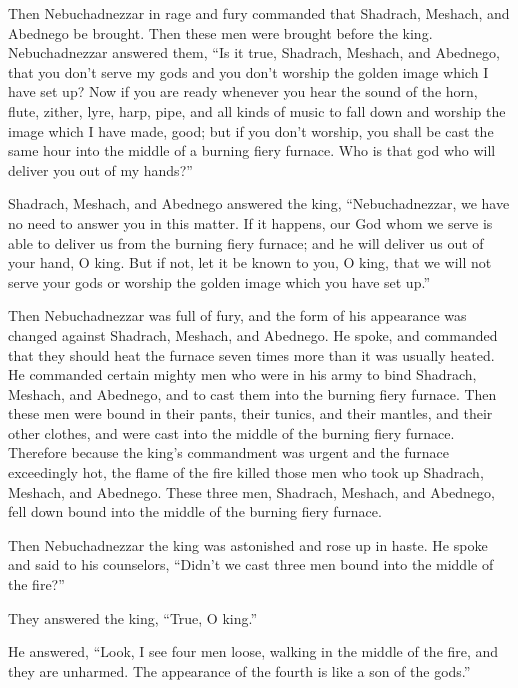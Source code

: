  Then Nebuchadnezzar in rage and fury commanded that
Shadrach, Meshach, and Abednego be brought. Then these men were brought
before the king.  Nebuchadnezzar answered them, ``Is it
true, Shadrach, Meshach, and Abednego, that you don't serve my gods and
you don't worship the golden image which I have set up? 
Now if you are ready whenever you hear the sound of the horn, flute,
zither, lyre, harp, pipe, and all kinds of music to fall down and
worship the image which I have made, good; but if you don't worship, you
shall be cast the same hour into the middle of a burning fiery furnace.
Who is that god who will deliver you out of my hands?''

 Shadrach, Meshach, and Abednego answered the king,
``Nebuchadnezzar, we have no need to answer you in this matter.
 If it happens, our God whom we serve is able to deliver us
from the burning fiery furnace; and he will deliver us out of your hand,
O king.  But if not, let it be known to you, O king, that
we will not serve your gods or worship the golden image which you have
set up.''

 Then Nebuchadnezzar was full of fury, and the form of his
appearance was changed against Shadrach, Meshach, and Abednego. He
spoke, and commanded that they should heat the furnace seven times more
than it was usually heated.  He commanded certain mighty
men who were in his army to bind Shadrach, Meshach, and Abednego, and to
cast them into the burning fiery furnace.  Then these men
were bound in their pants, their tunics, and their mantles, and their
other clothes, and were cast into the middle of the burning fiery
furnace.  Therefore because the king's commandment was
urgent and the furnace exceedingly hot, the flame of the fire killed
those men who took up Shadrach, Meshach, and Abednego. 
These three men, Shadrach, Meshach, and Abednego, fell down bound into
the middle of the burning fiery furnace.

 Then Nebuchadnezzar the king was astonished and rose up in
haste. He spoke and said to his counselors, ``Didn't we cast three men
bound into the middle of the fire?''

They answered the king, ``True, O king.''

 He answered, ``Look, I see four men loose, walking in the
middle of the fire, and they are unharmed. The appearance of the fourth
is like a son of the gods.''

